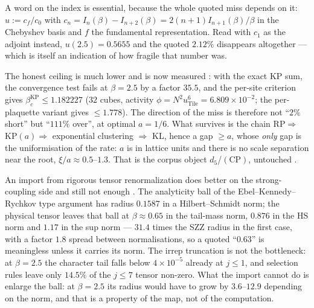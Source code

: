 \begin{itemize}
A word on the index is essential, because the whole quoted miss depends on it: $u:=c_f/c_0$ with
$c_n=I_n(\beta)-I_{n+2}(\beta)=2(n+1)I_{n+1}(\beta)/\beta$ in the Chebyshev basis and $f$ the
fundamental representation. Read with $c_1$ as the adjoint instead, $u(2.5)=0.5655$ and the quoted
$2.12\%$ disappears altogether --- which is itself an indication of how fragile that number was.

  The honest ceiling is much lower and is now measured \LE: with the exact KP sum, the convergence
  test fails at $\beta=2.5$ by a factor $35.5$, and the per-site criterion gives
  $\beta_c^{\mathrm{KP}}\le1.182227$ ($32$ cubes, activity $\phi=N^2u_{\mathrm{Tile}}^6=6.809\times
  10^{-2}$; the per-plaquette variant gives $\le1.778$). The direction of the miss is therefore not
  ``$2\%$ short'' but ``$111\%$ over'', at optimal $a=1/6$. What survives is the chain
  $\mathrm{RP}\Rightarrow$ KP$(a)\Rightarrow$ exponential clustering $\Rightarrow$ KL, hence a gap
  $\ge a$, whose \emph{only} gap is the uniformisation of the rate: $a$ is in lattice units and there
  is no scale separation near the root, $\xi/a\approx0.5$--$1.3$. That is the corpus object
  $d_5$/$(\mathrm{CP})$, untouched \LM.

  An import from rigorous tensor renormalization does better on the strong-coupling side and still
  not enough \LE. The analyticity ball of the Ebel--Kennedy--Rychkov type argument has radius
  $0.1587$ in a Hilbert--Schmidt norm; the physical tensor leaves that ball at
  $\beta\approx0.65$ in the tail-mass norm, $0.876$ in the HS norm and $1.17$ in the sup norm ---
  $31.4$ times the SZZ radius in the first case, with a factor $1.8$ spread between normalisations,
  so a quoted ``$0.63$'' is meaningless unless it carries its norm. The irrep truncation is not the
  bottleneck: at $\beta=2.5$ the character tail falls below $4\times10^{-5}$ already at $j\le1$, and
  selection rules leave only $14.5\%$ of the $j\le7$ tensor non-zero. What the import cannot do is
  enlarge the ball: at $\beta=2.5$ its radius would have to grow by $3.6$--$12.9$ depending on the
  norm, and that is a property of the map, not of the computation.


\end{itemize}
